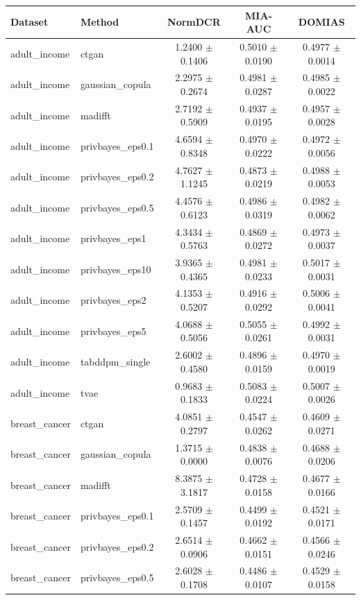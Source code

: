 \begin{tabular}{llccc}
\toprule
Dataset & Method & NormDCR & MIA-AUC & DOMIAS \\
\midrule
adult_income & ctgan & 1.2400 $\pm$ 0.1406 & 0.5010 $\pm$ 0.0190 & 0.4977 $\pm$ 0.0014 \\
adult_income & gaussian_copula & 2.2975 $\pm$ 0.2674 & 0.4981 $\pm$ 0.0287 & 0.4985 $\pm$ 0.0022 \\
adult_income & madifft & 2.7192 $\pm$ 0.5909 & 0.4937 $\pm$ 0.0195 & 0.4957 $\pm$ 0.0028 \\
adult_income & privbayes_eps0.1 & 4.6594 $\pm$ 0.8348 & 0.4970 $\pm$ 0.0222 & 0.4972 $\pm$ 0.0056 \\
adult_income & privbayes_eps0.2 & 4.7627 $\pm$ 1.1245 & 0.4873 $\pm$ 0.0219 & 0.4988 $\pm$ 0.0053 \\
adult_income & privbayes_eps0.5 & 4.4576 $\pm$ 0.6123 & 0.4986 $\pm$ 0.0319 & 0.4982 $\pm$ 0.0062 \\
adult_income & privbayes_eps1 & 4.3434 $\pm$ 0.5763 & 0.4869 $\pm$ 0.0272 & 0.4973 $\pm$ 0.0037 \\
adult_income & privbayes_eps10 & 3.9365 $\pm$ 0.4365 & 0.4981 $\pm$ 0.0233 & 0.5017 $\pm$ 0.0031 \\
adult_income & privbayes_eps2 & 4.1353 $\pm$ 0.5207 & 0.4916 $\pm$ 0.0292 & 0.5006 $\pm$ 0.0041 \\
adult_income & privbayes_eps5 & 4.0688 $\pm$ 0.5056 & 0.5055 $\pm$ 0.0261 & 0.4992 $\pm$ 0.0031 \\
adult_income & tabddpm_single & 2.6002 $\pm$ 0.4580 & 0.4896 $\pm$ 0.0159 & 0.4970 $\pm$ 0.0019 \\
adult_income & tvae & 0.9683 $\pm$ 0.1833 & 0.5083 $\pm$ 0.0224 & 0.5007 $\pm$ 0.0026 \\
breast_cancer & ctgan & 4.0851 $\pm$ 0.2797 & 0.4547 $\pm$ 0.0262 & 0.4609 $\pm$ 0.0271 \\
breast_cancer & gaussian_copula & 1.3715 $\pm$ 0.0000 & 0.4838 $\pm$ 0.0076 & 0.4688 $\pm$ 0.0206 \\
breast_cancer & madifft & 8.3875 $\pm$ 3.1817 & 0.4728 $\pm$ 0.0158 & 0.4677 $\pm$ 0.0166 \\
breast_cancer & privbayes_eps0.1 & 2.5709 $\pm$ 0.1457 & 0.4499 $\pm$ 0.0192 & 0.4521 $\pm$ 0.0171 \\
breast_cancer & privbayes_eps0.2 & 2.6514 $\pm$ 0.0906 & 0.4662 $\pm$ 0.0151 & 0.4566 $\pm$ 0.0246 \\
breast_cancer & privbayes_eps0.5 & 2.6028 $\pm$ 0.1708 & 0.4486 $\pm$ 0.0107 & 0.4529 $\pm$ 0.0158 \\

\end{tabular}
